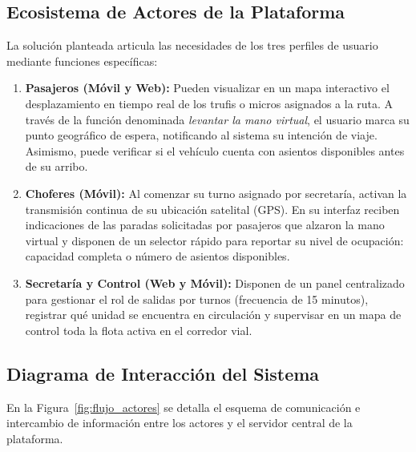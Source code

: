 \subsection{Ecosistema de Actores de la Plataforma}

La solución planteada articula las necesidades de los tres perfiles de usuario mediante funciones específicas:

\begin{enumerate}
    \item \textbf{Pasajeros (Móvil y Web):} Pueden visualizar en un mapa interactivo el desplazamiento en tiempo real de los trufis o micros asignados a la ruta. A través de la función denominada \emph{levantar la mano virtual}, el usuario marca su punto geográfico de espera, notificando al sistema su intención de viaje. Asimismo, puede verificar si el vehículo cuenta con asientos disponibles antes de su arribo.
    \item \textbf{Choferes (Móvil):} Al comenzar su turno asignado por secretaría, activan la transmisión continua de su ubicación satelital (GPS). En su interfaz reciben indicaciones de las paradas solicitadas por pasajeros que alzaron la mano virtual y disponen de un selector rápido para reportar su nivel de ocupación: capacidad completa o número de asientos disponibles.
    \item \textbf{Secretaría y Control (Web y Móvil):} Disponen de un panel centralizado para gestionar el rol de salidas por turnos (frecuencia de 15 minutos), registrar qué unidad se encuentra en circulación y supervisar en un mapa de control toda la flota activa en el corredor vial.
\end{enumerate}

\subsection{Diagrama de Interacción del Sistema}

En la Figura~\ref{fig:flujo_actores} se detalla el esquema de comunicación e intercambio de información entre los actores y el servidor central de la plataforma.

